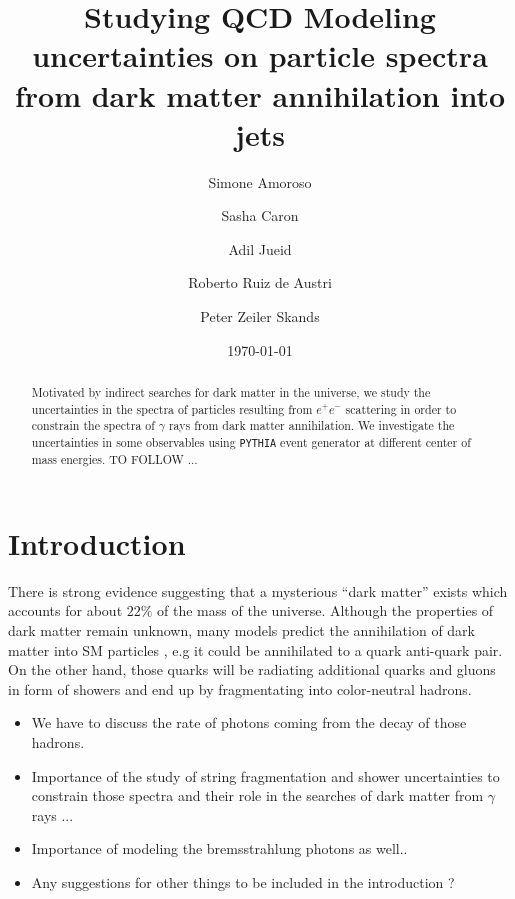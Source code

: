 \documentclass[aps,preprint,floatfix,nofootinbib,showpacs]{revtex4-1}
\begin{document}
\title{Studying QCD Modeling uncertainties on particle spectra from dark matter annihilation into jets}
\date{\today}
\author{Simone Amoroso}
\author{Sasha Caron}
\author{Adil Jueid}
\author{Roberto Ruiz de Austri}
\author{Peter Zeiler Skands}

\begin{abstract}
Motivated by indirect searches for dark matter in the universe, we study the
uncertainties in the spectra of particles resulting from $e^+ e^-$ scattering in order
to constrain the spectra of $\gamma$ rays from dark matter annihilation. 
We investigate the uncertainties in some observables using
\texttt{PYTHIA} event generator at different center of mass energies. TO FOLLOW ...
\end{abstract}


\maketitle

\section{Introduction} %
\label{Section1}
There is strong evidence suggesting that a mysterious “dark matter” exists which
accounts for about $22\%$ of the mass of the universe. Although the properties
of dark matter remain unknown, many models predict the annihilation of dark
matter into SM particles \cite{Bertone:2004pz}, e.g it could be annihilated 
to a quark anti-quark pair. On the other hand, those quarks will be radiating
additional quarks and gluons in form of showers and end up by fragmentating 
into color-neutral hadrons.
\begin{itemize}
 \item We have to discuss the rate of photons coming from the decay of those hadrons.
 \item Importance of the study of string fragmentation and shower uncertainties to constrain those spectra 
 and their role in the searches of dark matter from $\gamma$ rays ...
 \item Importance of modeling the bremsstrahlung photons as well..
 \item Any suggestions for other things to be included in the introduction ?
\end{itemize}
\end{document}
